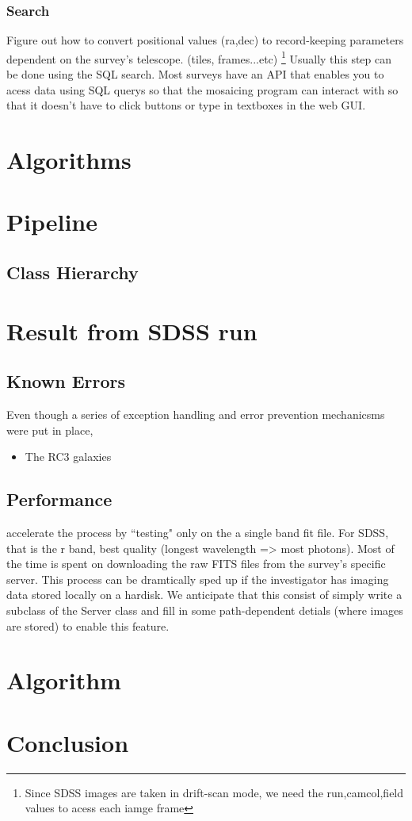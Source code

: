 \documentclass[5p]{elsarticle}
\begin{document}
		\subsubsection{Search}
			Figure out how to convert positional values (ra,dec) to record-keeping parameters dependent on the survey's telescope. (tiles, frames...etc) \footnote{Since SDSS images are taken in drift-scan mode, we need the run,camcol,field values to acess each iamge frame} Usually this step can be done using the SQL search. 
Most surveys have an API that enables you to acess data using SQL querys so that the mosaicing program can interact with so that it doesn't have to  click buttons or type in textboxes in the web GUI. 
\section{Algorithms}
\section{Pipeline}
	\subsection{Class Hierarchy}
\section{Result from SDSS run}
	\subsection{Known Errors}
		
	Even though a series of exception handling and error prevention mechanicsms were put in place, 
	 	\begin{itemize}
	 		\item The RC3 galaxies 
	 	\end{itemize}
	
	\subsection{Performance}
	accelerate the process by ``testing" only on the a single band fit file. For SDSS, that is the r band, best quality (longest wavelength => most photons).  Most of the time is spent on downloading the raw FITS files from the survey's specific server. This process can be dramtically sped up if the investigator has imaging data stored locally on a hardisk. We anticipate that this consist of 	 simply write a subclass of the Server class and fill in some path-dependent detials (where images are stored) to enable this feature.


\section{Algorithm}

%
%

\section{Conclusion}


\end{document}
